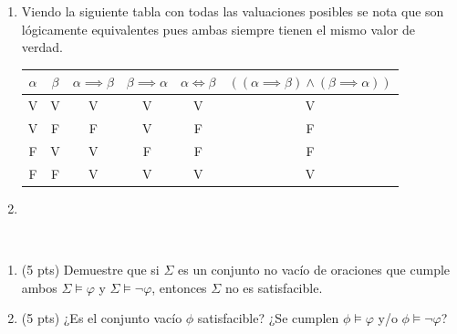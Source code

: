 \begin{sol}
    \begin{enumerate}[label=(\alph*)]
        \item Viendo la siguiente tabla con todas las valuaciones posibles se nota que son lógicamente equivalentes pues ambas siempre tienen el mismo valor de verdad.\\
              \begin{tabular}{|c|c|c|c|c|c|}
                  \hline
                  $\alpha$ & $\beta$ & $\alpha\implies\beta$ & $\beta\implies\alpha$ & $\alpha\iff\beta$ & $((\alpha \implies \beta) \wedge (\beta \implies \alpha))$ \\
                  \hline
                  \hline
                  V        & V       & V                     & V                     & V                 & V                                                          \\
                  V        & F       & F                     & V                     & F                 & F                                                          \\
                  F        & V       & V                     & F                     & F                 & F                                                          \\
                  F        & F       & V                     & V                     & V                 & V                                                          \\
                  \hline
              \end{tabular}
        \item
    \end{enumerate}
\end{sol}

\begin{prob}[10 pts]
    \
    \begin{enumerate}[label=(\alph*)]
        \item (5 pts) Demuestre que si $\Sigma$ es un conjunto no vacío de oraciones que cumple ambos $\Sigma \models \varphi$ y $\Sigma \models \neg \varphi$, entonces $\Sigma$ no es satisfacible.
        \item (5 pts) ¿Es el conjunto vacío $\phi$ satisfacible? ¿Se cumplen $\phi \models \varphi$ y/o $\phi \models \neg \varphi$?
    \end{enumerate}
\end{prob}

